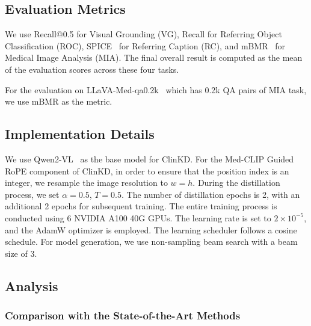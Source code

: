 \subsection{Evaluation Metrics}
We use Recall@0.5 for Visual Grounding (VG), Recall for Referring Object Classification (ROC), SPICE~\cite{anderson2016spicesemanticpropositionalimage} for Referring Caption (RC), and mBMR~\cite{huang2024BiRD} for Medical Image Analysis (MIA). The final overall result is computed as the mean of the evaluation scores across these four tasks.

For the evaluation on LLaVA-Med-qa0.2k~\cite{li2024llava} which has 0.2k QA pairs of MIA task, we use mBMR as the metric.

\subsection{Implementation Details}
We use Qwen2-VL~\cite{wang2024qwen2vlenhancingvisionlanguagemodels} as the base model for ClinKD. For the Med-CLIP Guided RoPE component of ClinKD, in order to ensure that the position index is an integer, we resample the image resolution to \( w = h \). During the distillation process, we set \( \alpha = 0.5 \), $T=0.5$. The number of distillation epochs is 2, with an additional 2 epochs for subsequent training. The entire training process is conducted using 6 NVIDIA A100 40G GPUs. The learning rate is set to \( 2 \times 10^{-5} \), and the AdamW optimizer is employed. The learning scheduler follows a cosine schedule. For model generation, we use non-sampling beam search with a beam size of 3.

\subsection{Analysis}
\subsubsection{Comparison with the State-of-the-Art Methods}

